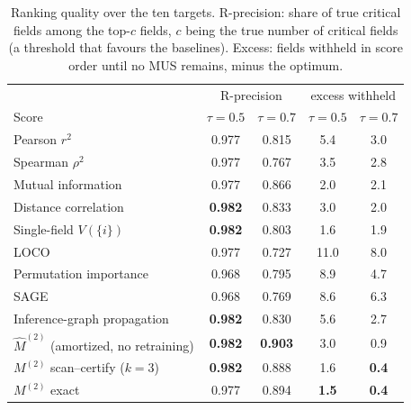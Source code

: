 \begin{table}[!tbp]
\centering\small
\caption{Ranking quality over the ten targets. R-precision: share of true critical fields among the top-$c$ fields, $c$ being
the true number of critical fields (a threshold that favours the baselines). Excess: fields withheld in score order until no
MUS remains, minus the optimum.}\label{tab:ranking}
\begin{tabular}{lcccc}
\toprule
 & \multicolumn{2}{c}{R-precision} & \multicolumn{2}{c}{excess withheld}\\
Score & $\tau=0.5$ & $\tau=0.7$ & $\tau=0.5$ & $\tau=0.7$\\
\midrule
Pearson $r^2$ & 0.977 & 0.815 & 5.4 & 3.0 \\
Spearman $\rho^2$ & 0.977 & 0.767 & 3.5 & 2.8 \\
Mutual information & 0.977 & 0.866 & 2.0 & 2.1 \\
Distance correlation & \textbf{0.982} & 0.833 & 3.0 & 2.0 \\
Single-field $V(\{i\})$ & \textbf{0.982} & 0.803 & 1.6 & 1.9 \\
LOCO & 0.977 & 0.727 & 11.0 & 8.0 \\
Permutation importance & 0.968 & 0.795 & 8.9 & 4.7 \\
SAGE & 0.968 & 0.769 & 8.6 & 6.3 \\
Inference-graph propagation & \textbf{0.982} & 0.830 & 5.6 & 2.7 \\
$\hat M^{(2)}$ (amortized, no retraining) & \textbf{0.982} & \textbf{0.903} & 3.0 & 0.9 \\
$M^{(2)}$ scan--certify ($k=3$) & \textbf{0.982} & 0.888 & 1.6 & \textbf{0.4} \\
$M^{(2)}$ exact & 0.977 & 0.894 & \textbf{1.5} & \textbf{0.4} \\
\bottomrule
\end{tabular}
\end{table}
